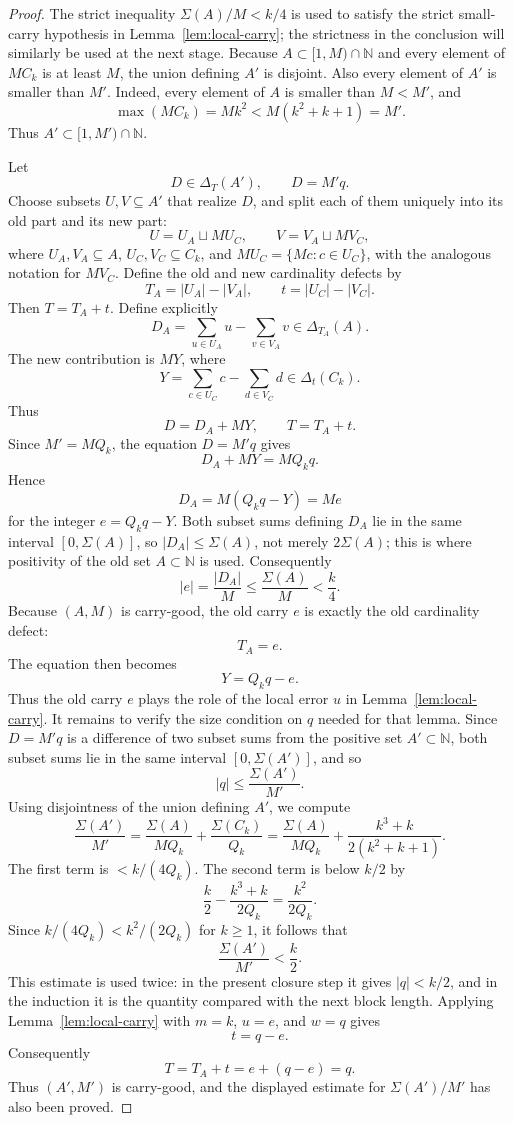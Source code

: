 \documentclass[11pt]{article}
\newcommand{\N}{\mathbb{N}}
\newcommand{\D}{\Delta}
\newcommand{\Sig}{\Sigma}
\begin{document}
\begin{proof}
The strict inequality $\Sig(A)/M<k/4$ is used to satisfy the strict small-carry hypothesis in Lemma~\ref{lem:local-carry}; the strictness in the conclusion will similarly be used at the next stage.  Because $A\subset[1,M)\cap\N$ and every element of $MC_k$ is at least $M$, the union defining $A'$ is disjoint.  Also every element of $A'$ is smaller than $M'$.  Indeed, every element of $A$ is smaller than $M<M'$, and
\[
        \max(MC_k)=Mk^2<M(k^2+k+1)=M'.
\]
Thus $A'\subset[1,M')\cap\N$.

Let
\[
        D\in\D_T(A'),
        \qquad
        D=M'q.
\]
Choose subsets $U,V\subseteq A'$ that realize $D$, and split each of them uniquely into its old part and its new part:
\[
        U=U_A\sqcup M U_C,
        \qquad
        V=V_A\sqcup M V_C,
\]
where $U_A,V_A\subseteq A$, $U_C,V_C\subseteq C_k$, and $M U_C=\{Mc:c\in U_C\}$, with the analogous notation for $M V_C$.  Define the old and new cardinality defects by
\[
        T_A=|U_A|-|V_A|,
        \qquad
        t=|U_C|-|V_C|.
\]
Then $T=T_A+t$.  Define explicitly
\[
        D_A=\sum_{u\in U_A}u-\sum_{v\in V_A}v\in\D_{T_A}(A).
\]
The new contribution is $MY$, where
\[
        Y=\sum_{c\in U_C}c-\sum_{d\in V_C}d\in\D_t(C_k).
\]
Thus
\[
        D=D_A+MY,
        \qquad
        T=T_A+t.
\]
Since $M'=M Q_k$, the equation $D=M'q$ gives
\[
        D_A+MY=M Q_k q.
\]
Hence
\[
        D_A=M(Q_k q-Y)=Me
\]
for the integer $e=Q_k q-Y$.  Both subset sums defining $D_A$ lie in the same interval $[0,\Sig(A)]$, so $|D_A|\le \Sig(A)$, not merely $2\Sig(A)$; this is where positivity of the old set $A\subset\N$ is used.  Consequently
\[
        |e|=\frac{|D_A|}{M}\le \frac{\Sig(A)}M<\frac k4.
\]
Because $(A,M)$ is carry-good, the old carry $e$ is exactly the old cardinality defect:
\[
        T_A=e.
\]
The equation then becomes
\[
        Y=Q_k q-e.
\]
Thus the old carry $e$ plays the role of the local error $u$ in Lemma~\ref{lem:local-carry}.  It remains to verify the size condition on $q$ needed for that lemma.  Since $D=M'q$ is a difference of two subset sums from the positive set $A'\subset\N$, both subset sums lie in the same interval $[0,\Sig(A')]$, and so
\[
        |q|\le \frac{\Sig(A')}{M'}.
\]
Using disjointness of the union defining $A'$, we compute
\[
\frac{\Sig(A')}{M'}
=
\frac{\Sig(A)}{M Q_k}+\frac{\Sig(C_k)}{Q_k}
=
\frac{\Sig(A)}{M Q_k}+\frac{k^3+k}{2(k^2+k+1)}.
\]
The first term is $<k/(4Q_k)$.  The second term is below $k/2$ by
\[
        \frac{k}{2}-\frac{k^3+k}{2Q_k}=\frac{k^2}{2Q_k}.
\]
Since $k/(4Q_k)<k^2/(2Q_k)$ for $k\ge1$, it follows that
\[
        \frac{\Sig(A')}{M'}<\frac k2.
\]
This estimate is used twice: in the present closure step it gives $|q|<k/2$, and in the induction it is the quantity compared with the next block length.  Applying Lemma~\ref{lem:local-carry} with $m=k$, $u=e$, and $w=q$ gives
\[
        t=q-e.
\]
Consequently
\[
        T=T_A+t=e+(q-e)=q.
\]
Thus $(A',M')$ is carry-good, and the displayed estimate for $\Sig(A')/M'$ has also been proved.
\end{proof}
\end{document}
